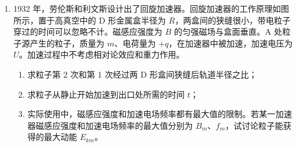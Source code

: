 \documentclass[\gkver]{gaokaozhenti}
\begin{document}
\begin{enumerate}
{	（2）第二次飞行中，设失去升力时的速度为 $v_{1}$，上升的高度为 $s_{1}$，匀加速运动 $s_{1}=\frac{1}{2}a_{1}t_{2}^{2}$；设失去升力后的加速度为 $a_{2}$，上升的高度为 $s_{2}$，由牛顿第二定律 $mg+f=ma_{2}$，$v_{1}=a_{1}t_{2}$，$s_{2}=\frac{v_{1}^{2}}{2a_{2}}$，解得 $h=s_{1}+s_{2}=42\Um$。

	（3）设失去升力下降阶段加速度为 $a_{3}$；恢复升力后加速度为 $a_{4}$，恢复升力时速度为 $v_{3}$，由牛顿第二定律 $mg-f=ma_{3}$，$F+f-mg=ma_{4}$，且 $\frac{v_{3}^{2}}{2a_{3}}+\frac{v_{3}^{2}}{2a_{4}}=h$，$v_{3}=a_{3}t_{3}$，解得 $t_{3}=\frac{3\sqrt{2}}{2}\Us$（或 $2.1\Us$）。

	运动过程如图所示。
}

\item
1932 年，劳伦斯和利文斯设计出了回旋加速器。回旋加速器的工作原理如图所示，置于高真空中的 D 形金属盒半径为 $R$，两盒间的狭缝很小，带电粒子穿过的时间可以忽略不计。磁感应强度为 $B$ 的匀强磁场与盒面垂直。A 处粒子源产生的粒子，质量为 $m$、电荷量为 $+q$，在加速器中被加速，加速电压为 $U$。加速过程中不考虑相对论效应和重力作用。
\begin{enumerate}
	\item
	求粒子第 2 次和第 1 次经过两 D 形盒间狭缝后轨道半径之比；
	\item
	求粒子从静止开始加速到出口处所需的时间 $t$；
	\item
	实际使用中，磁感应强度和加速电场频率都有最大值的限制。若某一加速器磁感应强度和加速电场频率的最大值分别为 $B_{m}$、$f_{m}$，试讨论粒子能获得的最大动能 $E_{km}$。
\end{enumerate}
\end{enumerate}
\end{document}
